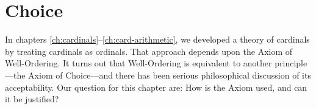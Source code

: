 \documentclass[../../../include/open-logic-chapter]{subfiles}
\begin{document}
\chapter{Choice}\label{ch:choice}
In chapters \ref{ch:cardinals}--\ref{ch:card-arithmetic}, we developed a theory of cardinals by treating cardinals as ordinals. That approach depends upon the Axiom of Well-Ordering. It turns out that Well-Ordering is equivalent to another principle---the Axiom of Choice---and there has been serious philosophical discussion of its acceptability. Our question for this chapter are: How is the Axiom used, and can it be justified?


\OLEndChapterHook
\end{document}
